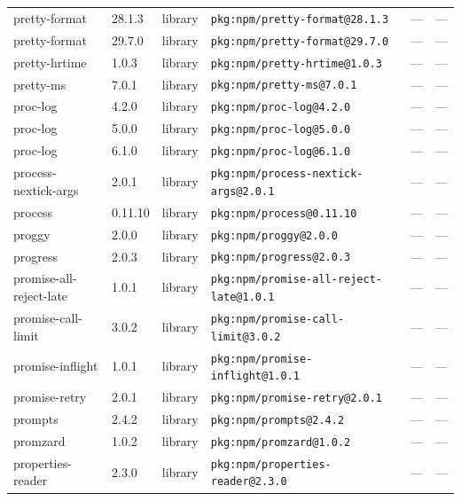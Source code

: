 \documentclass[11pt,a4paper]{article}
\begin{document}
\begin{longtable}{|p{4cm}|p{2cm}|p{1.6cm}|p{5cm}|p{1.5cm}|p{3.5cm}|}
\raggedright pretty-format & 28.1.3 & library & \small\texttt{pkg:npm/pretty-format@28.1.3} & — & \small — \\
\raggedright pretty-format & 29.7.0 & library & \small\texttt{pkg:npm/pretty-format@29.7.0} & — & \small — \\
\raggedright pretty-hrtime & 1.0.3 & library & \small\texttt{pkg:npm/pretty-hrtime@1.0.3} & — & \small — \\
\raggedright pretty-ms & 7.0.1 & library & \small\texttt{pkg:npm/pretty-ms@7.0.1} & — & \small — \\
\raggedright proc-log & 4.2.0 & library & \small\texttt{pkg:npm/proc-log@4.2.0} & — & \small — \\
\raggedright proc-log & 5.0.0 & library & \small\texttt{pkg:npm/proc-log@5.0.0} & — & \small — \\
\raggedright proc-log & 6.1.0 & library & \small\texttt{pkg:npm/proc-log@6.1.0} & — & \small — \\
\raggedright process-nextick-args & 2.0.1 & library & \small\texttt{pkg:npm/process-nextick-args@2.0.1} & — & \small — \\
\raggedright process & 0.11.10 & library & \small\texttt{pkg:npm/process@0.11.10} & — & \small — \\
\raggedright proggy & 2.0.0 & library & \small\texttt{pkg:npm/proggy@2.0.0} & — & \small — \\
\raggedright progress & 2.0.3 & library & \small\texttt{pkg:npm/progress@2.0.3} & — & \small — \\
\raggedright promise-all-reject-late & 1.0.1 & library & \small\texttt{pkg:npm/promise-all-reject-late@1.0.1} & — & \small — \\
\raggedright promise-call-limit & 3.0.2 & library & \small\texttt{pkg:npm/promise-call-limit@3.0.2} & — & \small — \\
\raggedright promise-inflight & 1.0.1 & library & \small\texttt{pkg:npm/promise-inflight@1.0.1} & — & \small — \\
\raggedright promise-retry & 2.0.1 & library & \small\texttt{pkg:npm/promise-retry@2.0.1} & — & \small — \\
\raggedright prompts & 2.4.2 & library & \small\texttt{pkg:npm/prompts@2.4.2} & — & \small — \\
\raggedright promzard & 1.0.2 & library & \small\texttt{pkg:npm/promzard@1.0.2} & — & \small — \\
\raggedright properties-reader & 2.3.0 & library & \small\texttt{pkg:npm/properties-reader@2.3.0} & — & \small — \\

\end{longtable}
\end{document}
